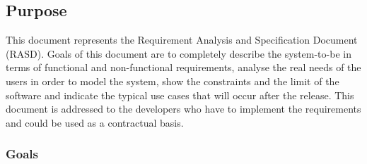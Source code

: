 
\subsection{Purpose}
This document represents the Requirement Analysis and Specification Document (RASD). Goals of
this document are to completely describe the system-to-be in terms of functional and non-functional
requirements, analyse the real needs of the users in order to model the system, show the constraints
and the limit of the software and indicate the typical use cases that will occur after the release. This
document is addressed to the developers who have to implement the requirements and could be used as
a contractual basis. 
\subsubsection{Goals}
